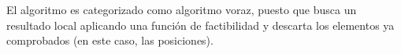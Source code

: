 El algoritmo es categorizado como algoritmo voraz, puesto que busca un resultado local aplicando una función de factibilidad y descarta los elementos ya comprobados (en este caso, las posiciones).
